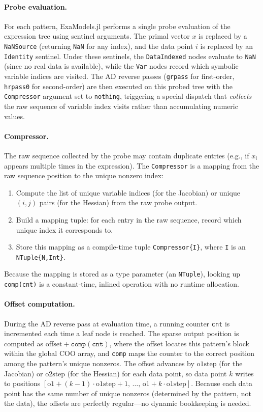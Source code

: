 \documentclass[11pt]{article}
\begin{document}
\paragraph{Probe evaluation.}
For each pattern, ExaModels.jl performs a single probe evaluation of the expression tree using sentinel arguments. The primal vector $x$ is replaced by a \texttt{NaNSource} (returning \texttt{NaN} for any index), and the data point $i$ is replaced by an \texttt{Identity} sentinel. Under these sentinels, the \texttt{DataIndexed} nodes evaluate to \texttt{NaN} (since no real data is available), while the \texttt{Var} nodes record which symbolic variable indices are visited. The AD reverse passes (\texttt{grpass} for first-order, \texttt{hrpass0} for second-order) are then executed on this probed tree with the \texttt{Compressor} argument set to \texttt{nothing}, triggering a special dispatch that \emph{collects} the raw sequence of variable index visits rather than accumulating numeric values.

\paragraph{Compressor.}
The raw sequence collected by the probe may contain duplicate entries (e.g., if $x_i$ appears multiple times in the expression). The \texttt{Compressor} is a mapping from the raw sequence position to the unique nonzero index:
\begin{enumerate}
  \item Compute the list of unique variable indices (for the Jacobian) or unique $(i,j)$ pairs (for the Hessian) from the raw probe output.
  \item Build a mapping tuple: for each entry in the raw sequence, record which unique index it corresponds to.
  \item Store this mapping as a compile-time tuple \texttt{Compressor\{I\}}, where \texttt{I} is an \texttt{NTuple\{N,Int\}}.
\end{enumerate}
Because the mapping is stored as a type parameter (an \texttt{NTuple}), looking up \texttt{comp(cnt)} is a constant-time, inlined operation with no runtime allocation.

\paragraph{Offset computation.}
During the AD reverse pass at evaluation time, a running counter \texttt{cnt} is incremented each time a leaf node is reached. The sparse output position is computed as $\text{offset} + \texttt{comp}(\texttt{cnt})$, where the offset locates this pattern's block within the global COO array, and \texttt{comp} maps the counter to the correct position among the pattern's unique nonzeros. The offset advances by $\text{o1step}$ (for the Jacobian) or $\text{o2step}$ (for the Hessian) for each data point, so data point $k$ writes to positions $[\text{o1} + (k{-}1) \cdot \text{o1step} + 1,\, \ldots,\, \text{o1} + k \cdot \text{o1step}]$. Because each data point has the same number of unique nonzeros (determined by the pattern, not the data), the offsets are perfectly regular---no dynamic bookkeeping is needed.
\end{document}
